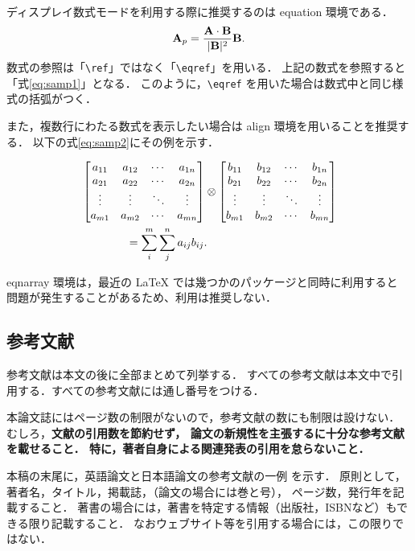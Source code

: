 ディスプレイ数式モードを利用する際に推奨するのは equation 環境である．
\begin{equation}
	\mathbf{A}_p = \frac{\mathbf{A}\cdot\mathbf{B}}{|\mathbf{B}|^2}\mathbf{B} .
	\label{eq:samp1}
\end{equation}
数式の参照は「\verb+\ref+」ではなく「\verb+\eqref+」を用いる．
上記の数式を参照すると「式\eqref{eq:samp1}」となる．
このように，\verb+\eqref+ を用いた場合は数式中と同じ様式の括弧がつく．

また，複数行にわたる数式を表示したい場合は align 環境を用いることを推奨する．
以下の式\eqref{eq:samp2}にその例を示す．

\begin{align}
	& \begin{bmatrix}
	a_{11} & a_{12} & \cdots & a_{1n} \\
	a_{21} & a_{22} & \cdots & a_{2n} \\
	\vdots & \vdots & \ddots & \vdots \\
	a_{m1} & a_{m2} & \cdots & a_{mn} \\
	\end{bmatrix}
	\otimes
	\begin{bmatrix}
	b_{11} & b_{12} & \cdots & b_{1n} \\
	b_{21} & b_{22} & \cdots & b_{2n} \\
	\vdots & \vdots & \ddots & \vdots \\
	b_{m1} & b_{m2} & \cdots & b_{mn} \\
	\end{bmatrix} \notag \\
	& \qquad \qquad = \sum_{i}^{m}\sum_{j}^{n}a_{ij}b_{ij} .
	\label{eq:samp2}
\end{align}

eqnarray 環境は，最近の LaTeX では幾つかのパッケージと同時に利用すると
問題が発生することがあるため、利用は推奨しない．

\subsection{参考文献}
参考文献は本文の後に全部まとめて列挙する．
すべての参考文献は本文中で引用する．すべての参考文献には通し番号をつける．

本論文誌にはページ数の制限がないので，参考文献の数にも制限は設けない．
むしろ，\textbf{文献の引用数を節約せず，
論文の新規性を主張するに十分な参考文献を載せること．
特に，著者自身による関連発表の引用を怠らないこと． }

本稿の末尾に，英語論文と日本語論文の参考文献の一例 \cite{Ito04} を示す．
原則として，著者名，タイトル，掲載誌，（論文の場合には巻と号），
ページ数，発行年を記載すること．
著書の場合には，著書を特定する情報（出版社，ISBNなど）もできる限り記載すること．
なおウェブサイト等\cite{ArtScience}を引用する場合には，この限りではない．

